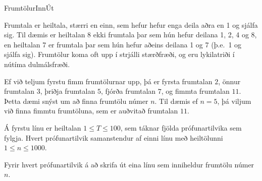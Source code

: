 \begin{problem}{Frumtölur}{Inn}{Út}{~}{~}

	Frumtala er heiltala, stærri en einn, sem hefur hefur enga deila aðra en 1 og sjálfa sig. Til dæmis er heiltalan 8 ekki frumtala þar sem hún hefur deilana 1, 2, 4 og 8, en heiltalan 7 er frumtala þar sem hún hefur aðeins deilana 1 og 7 (þ.e.\ 1 og sjálfa sig). Frumtölur koma oft upp í strjálli stærðfræði, og eru lykilatriði í nútíma dulmálsfræði.

	Ef við teljum fyrstu fimm frumtölurnar upp, þá er fyrsta frumtalan $2$, önnur frumtalan $3$, þriðja frumtalan $5$, fjórða frumtalan $7$, og fimmta frumtalan $11$. Þetta dæmi snýst um að finna frumtölu númer $n$. Til dæmis ef $n = 5$, þá viljum við finna fimmtu frumtöluna, sem er auðvitað frumtalan $11$.

	\Input

		Á fyrstu línu er heiltalan $1 \leq T \leq 100$, sem táknar fjölda prófunartilvika sem fylgja. Hvert prófunartilvik samanstendur af einni línu með heiltölunni $1 \leq n \leq 1000$.
	\Output

		Fyrir hvert prófunartilvik á að skrifa út eina línu sem inniheldur frumtölu númer $n$.

	\Examples

		\begin{example}
		\end{example}

\end{problem}